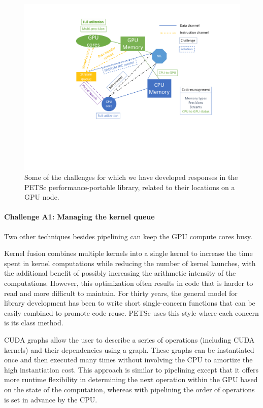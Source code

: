 \documentclass[10pt,journal,compsoc]{IEEEtran}
\begin{document}
\begin{figure}[htbp]
\begin{center}
\includegraphics[trim = 1.5in 2.5in .3in .6in, clip,width=.99\linewidth]{new-challenges.pdf}
\caption{Some of the challenges for which we have developed responses in the PETSc performance-portable library, related to their locations on a GPU node.}
\label{fig:challenges}
\end{center}
\end{figure}



\paragraph{Challenge A1: Managing the kernel queue}

Two other techniques besides pipelining can keep the GPU compute cores busy. 

Kernel fusion combines multiple kernels into a single kernel to increase the time spent in kernel computations while reducing the number of kernel launches, with the additional benefit of possibly increasing the arithmetic intensity of the computations.
However, this optimization often results in code that is harder to read and more difficult to maintain.
For thirty years, the general model for library development has been to write short single-concern functions that can be easily combined to promote code reuse. PETSc uses this style where
each concern is its class method.
    
CUDA graphs allow the user to describe a series of operations (including CUDA kernels) and their dependencies using a graph.
These graphs can be instantiated once and then executed many times without involving the CPU to amortize the high instantiation cost.
This approach is similar to pipelining except that it offers more runtime flexibility in determining the next operation within the GPU based on the state of the computation, whereas with pipelining the
order of operations is set in advance by the CPU.
\end{document}
